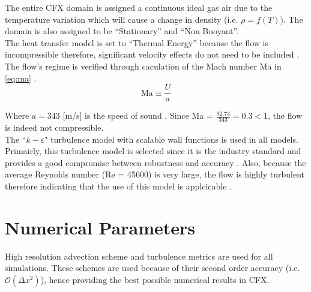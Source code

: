 The entire CFX domain is assigned a continuous ideal gas air due to the temperature variation which will cause a change in density (i.e. $\rho=f(T)$). The domain is also assigned to be ``Stationary'' and ``Non Buoyant''.\\

The heat transfer model is set to ``Thermal Energy'' because the flow is incompressible  therefore, significant velocity effects do not need to be included \cite{tut}. The flow's regime is verified through caculation of the Mach number Ma in \ref{eq:ma} \cite{fluids}.
\begin{equation}
	\label{eq:ma}
	 \text{Ma}\equiv \frac{U}{a} 
\end{equation}

Where $a=343$ [m/s] is the speed of sound \cite{fluids}. Since Ma = $\tfrac{92.73}{343}=0.3 < 1$, the flow is indeed not compressible.\\

The ``$k-\varepsilon$" turbulence model with scalable wall functions is used in all models. Primairly, this turbulence model is selected since it is the industry standard and provides a good compromise between robustness and accuracy \cite{cfx}. Also, because the average Reynolds number (Re = 45600) is very large, the flow is highly turbulent therefore indicating that the use of this model is applcicable \cite{cfdbook}.

\section{Numerical Parameters}
\label{sec:pre_num}

High resolution advection scheme and turbulence metrics are used for all simulations. These schemes are used because of their second order accuracy (i.e. $\mathcal{O} ( \Delta x^2)$), hence providing the best possible numerical results in CFX.\\

%
%
%
%
%

